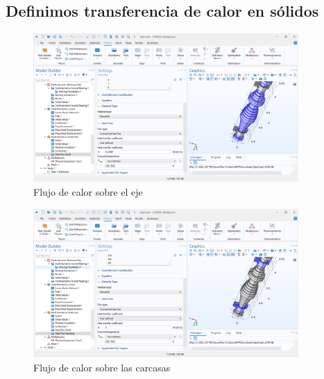 \documentclass{article}
\theoremstyle{mytheoremstyle}
\theoremstyle{mytheoremstyle}
\theoremstyle{myproblemstyle}
\begin{document}
            \subsection{Definimos transferencia de calor en sólidos}
             \begin{figure}[H]
              \centering
              \includegraphics[width=0.9\textwidth]{htfluxeje.png}
              \caption{Flujo de calor sobre el eje}
              \label{fig:comsol_flujo_calor_eje_img} %
            \end{figure}

             \begin{figure}[H]
              \centering
              \includegraphics[width=0.9\textwidth]{htflhous.png}
              \caption{Flujo de calor sobre las carcasas}
              \label{fig:comsol_flujo_calor_carcasas}
            \end{figure}
\end{document}
